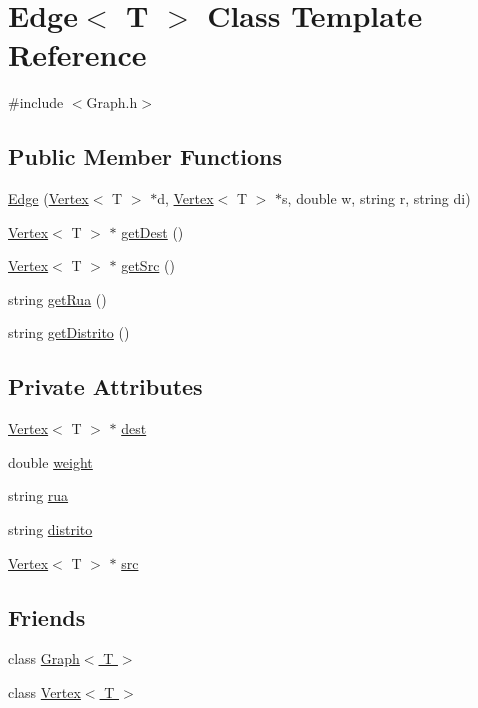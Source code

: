 \hypertarget{class_edge}{}\section{Edge$<$ T $>$ Class Template Reference}
\label{class_edge}


{\ttfamily \#include $<$Graph.\+h$>$}

\subsection*{Public Member Functions}
\begin{DoxyCompactItemize}
\item 
\hyperlink{class_edge_aba1f7e4e068577ca4687da274ecbb5f9}{Edge} (\hyperlink{class_vertex}{Vertex}$<$ T $>$ $\ast$d, \hyperlink{class_vertex}{Vertex}$<$ T $>$ $\ast$s, double w, string r, string di)
\item 
\hyperlink{class_vertex}{Vertex}$<$ T $>$ $\ast$ \hyperlink{class_edge_aaac5b053bdaa88b1da416e734487eb25}{get\+Dest} ()
\item 
\hyperlink{class_vertex}{Vertex}$<$ T $>$ $\ast$ \hyperlink{class_edge_a2645a9ac350e79626dc5472714b3b3b1}{get\+Src} ()
\item 
string \hyperlink{class_edge_accb828015f1926387735bc967b236bc0}{get\+Rua} ()
\item 
string \hyperlink{class_edge_a03d90697f0dd989971c4a6253cd7fa92}{get\+Distrito} ()
\end{DoxyCompactItemize}
\subsection*{Private Attributes}
\begin{DoxyCompactItemize}
\item 
\hyperlink{class_vertex}{Vertex}$<$ T $>$ $\ast$ \hyperlink{class_edge_ae4d65678b91bd9d814af4720ad87cd0c}{dest}
\item 
double \hyperlink{class_edge_af188b57b604f0d65e2da48733bd76426}{weight}
\item 
string \hyperlink{class_edge_abbe53eb540c289810569a5d67691317d}{rua}
\item 
string \hyperlink{class_edge_a5853093c36a4a3f483ce705d99f87f67}{distrito}
\item 
\hyperlink{class_vertex}{Vertex}$<$ T $>$ $\ast$ \hyperlink{class_edge_ac19036953f77507f329af34355aed4db}{src}
\end{DoxyCompactItemize}
\subsection*{Friends}
\begin{DoxyCompactItemize}
\item 
class \hyperlink{class_edge_aefa9b76cd57411c5354e5620dc2d84dd}{Graph$<$ T $>$}
\item 
class \hyperlink{class_edge_a2e120a12dec663fa334633b4f26cbed8}{Vertex$<$ T $>$}
\end{DoxyCompactItemize}


